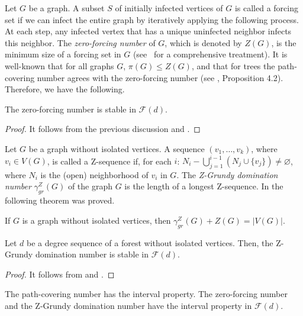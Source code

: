 \documentclass{BICA}
\begin{document}
Let $G$ be a graph. A subset $S$ of initially infected vertices of $G$ is called a forcing set if we can infect the entire graph by iteratively applying the following process. At each step, any infected vertex that has a unique uninfected neighbor infects this neighbor. The \emph{zero-forcing number} of $G$, which is denoted by \(Z(G)\), is the minimum size of a forcing set in $G$ (see~\cite{HogbenLinShader2022} for a comprehensive treatment). It is well-known that for all graphs \(G\), \(\pi(G) \leq Z(G)\), and that for trees the path-covering number agrees with the zero-forcing number (see \cite{work2008zero}, Proposition 4.2). Therefore, we have the following.

\begin{corollary}
	\label{zero_forc_stable}
	The zero-forcing number is stable in $\mathcal{F}(d)$.
\end{corollary}

\begin{proof}
	It follows from the previous discussion and .
\end{proof}

Let \(G\) be a graph without isolated vertices. A sequence \((v_{1},\dots,v_{k})\), where \(v_{i}\in V(G)\), is called a Z-sequence if, for each \(i\): $N_i - \bigcup_{j=1}^{i-1} \left(N_j\cup\{v_j\}\right) \neq \varnothing$, where $N_i$ is the (open) neighborhood of $v_i$ in $G$. The \emph{Z-Grundy domination number} \(\gamma_{gr}^{Z}(G)\) of the graph \(G\) is the length of a longest Z-sequence. In \cite{bresar2017grundy} the following theorem was proved.

\begin{theorem}
	\label{zgrundydom_teo_citado}
	If \(G\) is a graph without isolated vertices, then $\gamma_{gr}^{Z}(G)+Z(G)=|V(G)|$.
\end{theorem}

\begin{corollary}
	\label{zgrundy_stable}
	Let $d$ be a degree sequence of a forest without isolated vertices. Then, the Z-Grundy domination number is stable in $\mathcal{F}(d)$.
\end{corollary}

\begin{proof}
	It follows from  and .
\end{proof}

\begin{theorem}
	The path-covering number has the interval property. The zero-forcing number and the Z-Grundy domination number have the interval property in $\mathcal{F}(d)$.
\end{theorem}
\end{document}
